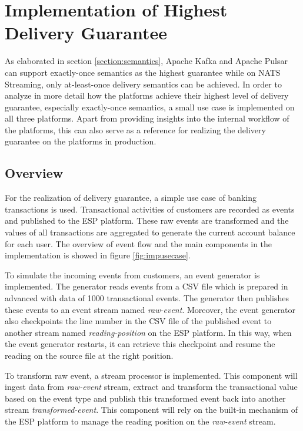 \chapter{Implementation of Highest Delivery Guarantee} \label{chap:implementation}
As elaborated in section \ref{section:semantics}, Apache Kafka and Apache Pulsar can support exactly-once semantics as the highest guarantee while on NATS Streaming, only at-least-once delivery semantics can be achieved. In order to analyze in more detail how the platforms achieve their highest level of delivery guarantee, especially exactly-once semantics, a small use case is implemented on all three platforms. Apart from providing insights into the internal workflow of the platforms, this can also serve as a reference for realizing the delivery guarantee on the platforms in production. 
\section{Overview}
For the realization of delivery guarantee, a simple use case of banking transactions is used. Transactional activities of customers are recorded as events and published to the ESP platform. These raw events are transformed and the values of all transactions are aggregated to generate the current account balance for each user. The overview of event flow and the main components in the implementation is showed in figure \ref{fig:impusecase}.

To simulate the incoming events from customers, an event generator is implemented. The generator reads events from a CSV file which is prepared in advanced with data of 1000 transactional events. The generator then publishes these events to an event stream named \emph{raw-event}. Moreover, the event generator also checkpoints the line number in the CSV file of the published event to another stream named \emph{reading-position} on the ESP platform. In this way, when the event generator restarts, it can retrieve this checkpoint and resume the reading on the source file at the right position. 

To transform raw event, a stream processor is implemented. This component will ingest data from \emph{raw-event} stream, extract and transform the transactional value based on the event type and publish this transformed event back into another stream \emph{transformed-event}. This component will rely on the built-in mechanism of the ESP platform to manage the reading position on the \emph{raw-event} stream.



